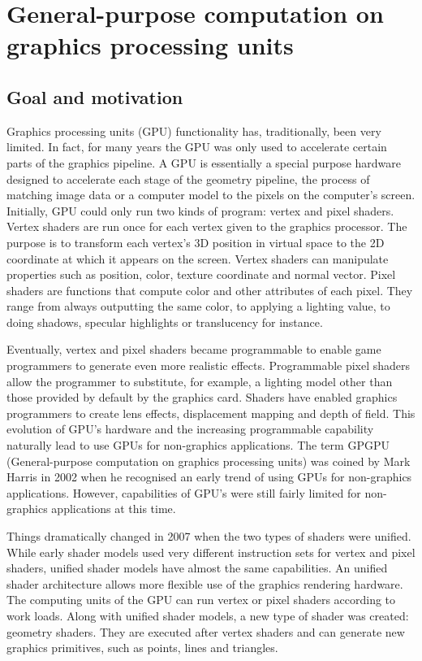 \section{General-purpose computation on graphics processing units}

	\subsection{Goal and motivation}
Graphics processing units (GPU) functionality has, traditionally, been very limited. In fact, for many years the GPU was only used to accelerate certain parts of the graphics pipeline. A GPU is essentially a special purpose hardware designed to accelerate each stage of the geometry pipeline, the process of matching image data or a computer model to the pixels on the computer's screen. Initially, GPU could only run two kinds of program: vertex and pixel shaders. Vertex shaders are run once for each vertex given to the graphics processor. The purpose is to transform each vertex's 3D position in virtual space to the 2D coordinate at which it appears on the screen. Vertex shaders can manipulate properties such as position, color, texture coordinate and normal vector. Pixel shaders are functions that compute color and other attributes of each pixel. They range from always outputting the same color, to applying a lighting value, to doing shadows, specular highlights or translucency for instance.

Eventually, vertex and pixel shaders became programmable to enable game programmers to generate even more realistic effects. Programmable pixel shaders allow the programmer to substitute, for example, a lighting model other than those provided by default by the graphics card. Shaders have enabled graphics programmers to create lens effects, displacement mapping and depth of field. This evolution of GPU's hardware and the increasing programmable capability naturally lead to use GPUs for non-graphics applications. The term GPGPU (General-purpose computation on graphics processing units) was coined by Mark Harris in 2002 when he recognised an early trend of using GPUs for non-graphics applications. However, capabilities of GPU's were still fairly limited for non-graphics applications at this time. 

Things dramatically changed in 2007 when the two types of shaders were unified. While early shader models used very different instruction sets for vertex and pixel shaders, unified shader models have almost the same capabilities. An unified shader architecture allows more flexible use of the graphics rendering hardware. The computing units of the GPU can run vertex or pixel shaders according to work loads. Along with unified shader models, a new type of shader was created: geometry shaders. They are executed after vertex shaders and can generate new graphics primitives, such as points, lines and triangles. 


